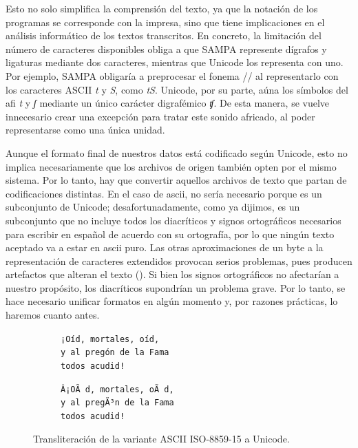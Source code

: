 Esto no solo simplifica la comprensión del texto, ya que la notación de los programas se corresponde con la impresa, sino que tiene implicaciones en el análisis informático de los textos transcritos. En concreto, la limitación del número de caracteres disponibles obliga a que SAMPA represente dígrafos y ligaturas mediante dos caracteres, mientras que Unicode los representa con uno. Por ejemplo, SAMPA obligaría a preprocesar el fonema // al representarlo con los caracteres ASCII \textit{t} y \textit{S}, como \textit{tS}. Unicode, por su parte, aúna los símbolos del \ac{afi} \textit{t} y \textit{ʃ} mediante un único carácter digrafémico \textsc{\textit{ʧ}}. De esta manera, se vuelve innecesario crear una excepción para tratar este sonido africado, al poder representarse como una única unidad.

Aunque el formato final de nuestros datos está codificado según Unicode, esto no implica necesariamente que los archivos de origen también opten por el mismo sistema. Por lo tanto, hay que convertir aquellos archivos de texto que partan de codificaciones distintas. En el caso de \ac{ascii}, no sería necesario porque es un subconjunto de Unicode; desafortunadamente, como ya dijimos, es un subconjunto que no incluye todos los diacríticos y signos ortográficos necesarios para escribir en español de acuerdo con su ortografía, por lo que ningún texto aceptado va a estar en \ac{ascii} puro. Las otras aproximaciones de un byte a la representación de caracteres extendidos provocan serios problemas, pues producen artefactos que alteran el texto (). Si bien los signos ortográficos no afectarían a nuestro propósito, los diacríticos supondrían un problema grave. Por lo tanto, se hace necesario unificar formatos en algún momento y, por razones prácticas, lo haremos cuanto antes. 

\begin{figure}[!ht]
	\centering
	\footnotesize
	\begin{subfigure}{.5\textwidth}
		\texttt{¡Oíd, mortales, oíd,\\
			y al pregón de la Fama\\
			todos acudid!}
	\end{subfigure}%
	\begin{subfigure}{.40\textwidth}
		\texttt{Â¡OÃ d, mortales, oÃ d,\\
			y al pregÃ³n de la Fama\\
			todos acudid!}
	\end{subfigure}
	\caption{Transliteración de la variante ASCII ISO-8859-15 a Unicode.}
	\label{fig:codificacion}
	\normalsize
\end{figure}

